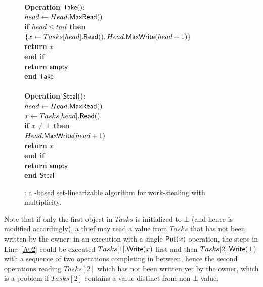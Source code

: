\begin{figure}[ht]
{\begin{minipage}[t]{150mm}
\begin{tabbing}
        {\bf Operation} \({\sf \small Take}()\): \\
         \> \> \(head \leftarrow Head.{\sf \small MaxRead}()\)\\
         \> \> {\bf if \(head \leq tail\) then}\\
         \> \> \> \(\{ x \leftarrow Tasks[head].{\sf \small Read}(),
        Head.{\sf \small MaxWrite}(head+1)\}\)\\
         \> \> \> {\bf return} \(x\)\\
         \> \> {\bf end if}\\
         \> \> {\bf return} ${\sf \small empty}$\\
        {\bf end} ${\sf \small Take}$ \\ \\


        {\bf Operation} \({\sf \small Steal}()\): \\
         \> \> \(head \leftarrow Head.{\sf \small MaxRead}()\)\\
         \> \> \(x \leftarrow Tasks[head].{\sf \small Read}()\) \\
         \> \> {\bf if \(x \neq \bot\) then}\\
         \> \> \> \(Head.{\sf \small MaxWrite}(head+1)\)\\

         \> \> \> {\bf return} \(x\)\\
         \> \> {\bf end if}\\
         \> \> {\bf return} ${\sf \small empty}$\\
        {\bf end} ${\sf \small Steal}$

      \end{tabbing}
    \end{minipage}
  }
  \caption{\label{figure-max-reg-mult}\WFWSM: a \MaxReg-based
    set-linearizable algorithm for work-stealing with multiplicity.}
\end{figure}

Note that if only the first object in \(Tasks\) is initialized to \(\bot\) (and hence \Put is modified accordingly), a thief may read a value from \(Tasks\) that has not been written by the owner: in an execution with a single \({\sf \small Put}(x)\) operation, the steps in Line~\ref{A02} could be executed \(Tasks[1].{\sf \small Write}(x)\) first and then \(Tasks[2].{\sf \small Write}(\bot)\) with a sequence of two \Steal operations completing in between, hence the second operations reading $Tasks[2]$ which has not been written yet by the owner, which is a problem if \(Tasks[2]\) contains a value distinct from non-\(\bot\) value.


